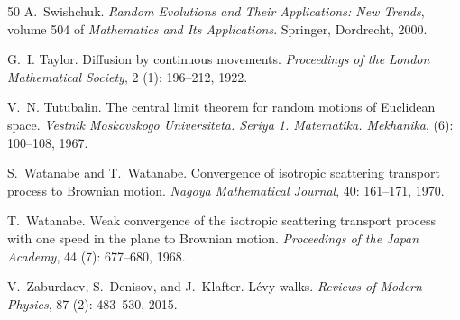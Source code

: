 \documentclass[10pt]{article}
\newcommand{\1}{1\!\!\!\;{\rm I}}
\theoremstyle{plain}
\theoremstyle{definition}
\numberwithin{equation}{section}
\begin{document}
\begin{thebibliography}{50}
A.~Swishchuk.
\newblock \emph{Random Evolutions and Their Applications: New Trends}, volume
  504 of \emph{Mathematics and Its Applications}.
\newblock Springer, Dordrecht, 2000.

G.~I. Taylor.
\newblock Diffusion by continuous movements.
\newblock \emph{Proceedings of the London Mathematical Society}, 2
  (1): 196--212, 1922.

V.~N. Tutubalin.
\newblock The central limit theorem for random motions of {E}uclidean space.
\newblock \emph{Vestnik Moskovskogo Universiteta. Seriya 1. Matematika.
  Mekhanika},  (6): 100--108, 1967.

S.~Watanabe and T.~Watanabe.
\newblock Convergence of isotropic scattering transport process to {B}rownian
  motion.
\newblock \emph{Nagoya Mathematical Journal}, 40: 161--171, 1970.

T.~Watanabe.
\newblock Weak convergence of the isotropic scattering transport process with
  one speed in the plane to {B}rownian motion.
\newblock \emph{Proceedings of the Japan Academy}, 44 (7):
  677--680, 1968.

V.~Zaburdaev, S.~Denisov, and J.~Klafter.
\newblock L{\'e}vy walks.
\newblock \emph{Reviews of Modern Physics}, 87 (2): 483--530,
  2015.

\end{thebibliography}
\end{document}
